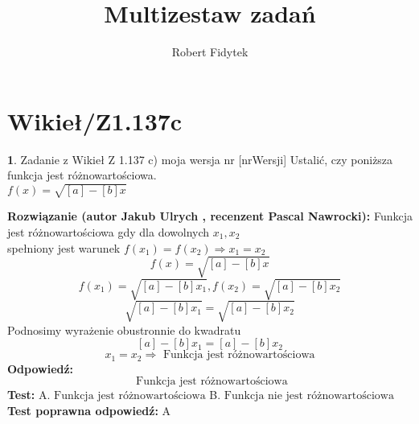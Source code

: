 \documentclass[12pt, a4paper]{article}
\title{Multizestaw zadań}
\author{Robert Fidytek}
\date{}
\theoremstyle{definition} %
\newtheorem{zad}{}
\newcommand{\kategoria}[1]{\section{#1}} %
\newcommand{\zadStart}[1]{\begin{zad}#1\newline} %
\newcommand{\zadStop}{\end{zad}}   %
\newcommand{\rozwStart}[2]{\noindent \textbf{Rozwiązanie (autor #1 , recenzent #2): }\newline} %
\newcommand{\rozwStop}{\newline}                                            %
\newcommand{\odpStart}{\noindent \textbf{Odpowiedź:}\newline}    %
\newcommand{\odpStop}{\newline}                                             %
\newcommand{\testStart}{\noindent \textbf{Test:}\newline} %
\newcommand{\testStop}{\newline} %
\newcommand{\kluczStart}{\noindent \textbf{Test poprawna odpowiedź:}\newline} %
\newcommand{\kluczStop}{\newline} %
\begin{document}
\maketitle


\kategoria{Wikieł/Z1.137c}
\zadStart{Zadanie z Wikieł Z 1.137 c) moja wersja nr [nrWersji]}
Ustalić, czy poniższa funkcja jest różnowartościowa.\\ $f(x)=\sqrt{[a]-[b]x}$
\zadStop
\rozwStart{Jakub Ulrych}{Pascal Nawrocki}
Funkcja jest różnowartościowa gdy dla dowolnych $x_{1},x_{2}$\\ spełniony jest warunek $f(x_{1})=f(x_{2})\Rightarrow x_{1}=x_{2}$
$$f(x)=\sqrt{[a]-[b]x}$$
$$f(x_{1})=\sqrt{[a]-[b]x_{1}},f(x_{2})=\sqrt{[a]-[b]x_{2}}$$
$$\sqrt{[a]-[b]x_{1}}=\sqrt{[a]-[b]x_{2}}$$
Podnosimy wyrażenie obustronnie do kwadratu
$$[a]-[b]x_{1}=[a]-[b]x_{2}$$
$$x_{1}=x_{2}\Rightarrow\text{ Funkcja jest różnowartościowa}$$
\rozwStop
\odpStart
$$\text{ Funkcja jest różnowartościowa}$$
\odpStop
\testStart
A.$\text{ Funkcja jest różnowartościowa}$
B.$\text{ Funkcja nie jest różnowartościowa}$
\testStop
\kluczStart
A
\kluczStop
\end{document}
